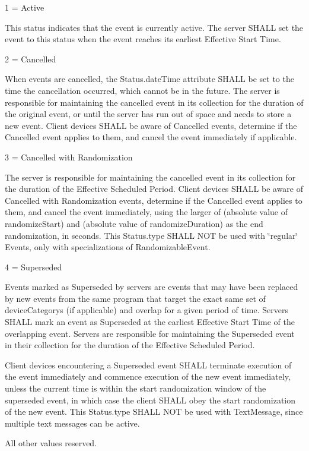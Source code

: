 1 = Active

This status indicates that the event is currently active. The server S\+H\+A\+LL set the event to this status when the event reaches its earliest Effective Start Time.

2 = Cancelled

When events are cancelled, the Status.\+date\+Time attribute S\+H\+A\+LL be set to the time the cancellation occurred, which cannot be in the future. The server is responsible for maintaining the cancelled event in its collection for the duration of the original event, or until the server has run out of space and needs to store a new event. Client devices S\+H\+A\+LL be aware of Cancelled events, determine if the Cancelled event applies to them, and cancel the event immediately if applicable.

3 = Cancelled with Randomization

The server is responsible for maintaining the cancelled event in its collection for the duration of the Effective Scheduled Period. Client devices S\+H\+A\+LL be aware of Cancelled with Randomization events, determine if the Cancelled event applies to them, and cancel the event immediately, using the larger of (absolute value of randomize\+Start) and (absolute value of randomize\+Duration) as the end randomization, in seconds. This Status.\+type S\+H\+A\+LL N\+OT be used with \char`\"{}regular\char`\"{} Events, only with specializations of Randomizable\+Event.

4 = Superseded

Events marked as Superseded by servers are events that may have been replaced by new events from the same program that target the exact same set of device\+Category\textquotesingle{}s (if applicable) and overlap for a given period of time. Servers S\+H\+A\+LL mark an event as Superseded at the earliest Effective Start Time of the overlapping event. Servers are responsible for maintaining the Superseded event in their collection for the duration of the Effective Scheduled Period.

Client devices encountering a Superseded event S\+H\+A\+LL terminate execution of the event immediately and commence execution of the new event immediately, unless the current time is within the start randomization window of the superseded event, in which case the client S\+H\+A\+LL obey the start randomization of the new event. This Status.\+type S\+H\+A\+LL N\+OT be used with Text\+Message, since multiple text messages can be active.

All other values reserved. \mbox{\label{group__EventStatus_gaed58cdf8b3efb07a6241882255bc644c}} 
